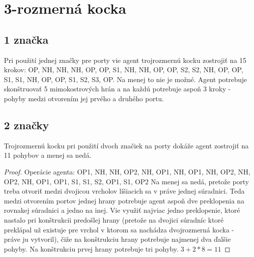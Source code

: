 \section{3-rozmerná kocka}
\subsection{1 značka}
Pri použití jednej značky pre porty vie agent trojrozmernú kocku zostrojiť 
na 15 krokov:
OP, NH, NH, NH, OP, OP, S1, NH, NH, OP, OP, S2, S2, NH, OP, OP, S1, S1, NH, OP, OP, S1, S2, S3, OP. Na
menej to nie je možné. Agent potrebuje skonštruovať 5 mimokostrových hrán a na
každú potrebuje aspoň 3 kroky - pohyby medzi otvorením jej prvého a druhého portu.

\subsection{2 značky}
\begin{veta}
Trojrozmernú kocku pri použití dvoch značiek na porty dokáže agent zostrojiť
na 11 pohybov a menej sa nedá. 
\end{veta}
\begin{proof}
Operácie agenta:
OP1, NH, NH, OP2, NH, OP1, NH, OP1, NH, OP2, NH, OP2, NH, OP1, OP1, S1, S1, S2, OP1, S1, OP2
Na menej sa nedá, pretože porty treba otvoriť medzi dvojicou vrcholov
líšiacich sa v práve jednej súradnici. Teda medzi otvorením portov jednej
hrany potrebuje agent aspoň dve preklopenia na rovnakej súradnici a jedno na
inej. Vie využiť najviac jedno preklopenie, ktoré nastalo pri konštrukcii
predošlej hrany (pretože na dvojici súradníc ktoré preklápal už existuje pre
vrchol v ktorom sa nachádza dvojrozmerná kocka - práve ju vytvoril), 
čiže na konštrukciu hrany potrebuje najmenej dva ďalšie
pohyby. Na konštrukciu prvej hrany potrebuje tri pohyby. $3 + 2 * 8 = 11$
\end{proof}

